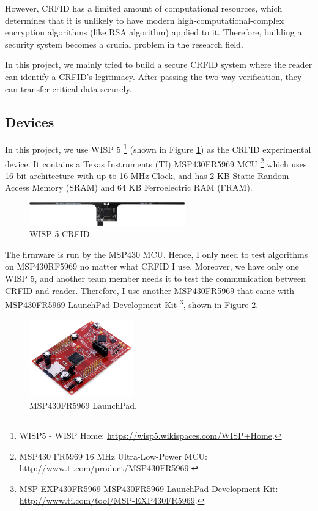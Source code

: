 \documentclass[sigconf, review=false]{acmart}
\let\OldTexttrademark\texttrademark
\renewcommand{\texttrademark}{\OldTexttrademark\xspace}%
\begin{document}
However, CRFID has a limited amount of computational resources, which determines that it is unlikely to have
modern high-computational-complex encryption algorithms (like RSA algorithm) applied to it.
Therefore, building a security system becomes a crucial problem in the research field.

In this project, we mainly tried to build a secure CRFID system
where the reader can identify a CRFID's legitimacy.
After passing the two-way verification, they can transfer critical data securely.

\subsection{Devices}
In this project, we use WISP 5 \footnote{WISP5 - WISP Home: \url{https://wisp5.wikispaces.com/WISP+Home}.} (shown in Figure \ref{fig-wisp5})
as the CRFID experimental device.
It contains a Texas Instruments (TI) MSP430FR5969 MCU \footnote{MSP430\texttrademark FR5969 16 MHz Ultra-Low-Power MCU: \url{http://www.ti.com/product/MSP430FR5969}.}
which uses 16-bit architecture with up to 16‑MHz Clock, and has 2 KB Static Random Access Memory (SRAM) and 64 KB Ferroelectric RAM (FRAM).

\begin{figure}
\centering
\includegraphics[width=0.6\textwidth]{wisp5.png}
\caption{WISP 5 CRFID.}
\label{fig-wisp5}
\end{figure}

The firmware is run by the MSP430 MCU. Hence, I only need to test algorithms on MSP430RF5969 no matter what CRFID I use.
Moreover, we have only one WISP 5, and another team member needs it to test the communication between CRFID and reader.
Therefore, I use another MSP430FR5969 that came with MSP430FR5969 LaunchPad Development Kit
\footnote{MSP-EXP430FR5969 MSP430FR5969 LaunchPad Development Kit: \url{http://www.ti.com/tool/MSP-EXP430FR5969}.},
shown in Figure \ref{fig-launchpad}.

\begin{figure}
\centering
\includegraphics[width=0.4\textwidth]{launchpad.jpg}
\caption{MSP430FR5969 LaunchPad.}
\label{fig-launchpad}
\end{figure}
\end{document}
